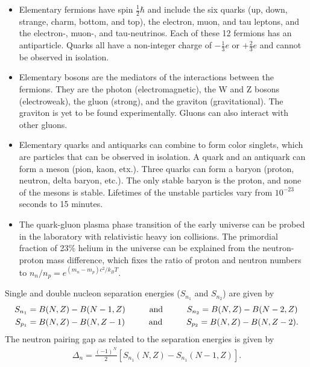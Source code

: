 \begin{itemize}
	\item Elementary fermions have spin $\frac{1}{2}\hbar$ and include the six quarks (up, down, strange, charm, bottom, and top), the electron, muon, and tau leptons, and the electron-, muon-, and tau-neutrinos. Each of these 12 fermions has an antiparticle. Quarks all have a non-integer charge of $-\frac{1}{3}e$ or $+\frac{2}{3}e$ and cannot be observed in isolation.
	\item Elementary bosons are the mediators of the interactions between the fermions. They are the photon (electromagnetic), the W and Z bosons (electroweak), the gluon (strong), and the graviton (gravitational). The graviton is yet to be found experimentally. Gluons can also interact with other gluons. 
	\item Elementary quarks and antiquarks can combine to form color singlets, which are particles that can be observed in isolation. A quark and an antiquark can form a meson (pion, kaon, etx.). Three quarks can form a baryon (proton, neutron, delta baryon, etc.). The only stable baryon is the proton, and none of the mesons is stable. Lifetimes of the unstable particles vary from $10^{-23}$ seconds to 15 minutes.
	\item The quark-gluon plasma phase transition of the early universe can be probed in the laboratory with relativistic heavy ion collisions. The primordial fraction of 23\% helium in the universe can be explained from the neutron-proton mass difference, which fixes the ratio of proton and neutron numbers to $n_n/n_p = e^{(m_n-m_p)c^2/k_BT}$.
\end{itemize}
Single and double nucleon separation energies ($S_{n_1}$ and $S_{n_2}$) are given by
\begin{align}
	S_{n_1} &= B(N,Z)-B(N-1,Z) \andspace{1cm} S_{n_2} = B(N,Z)-B(N-2,Z) \\
	S_{p_1} &= B(N,Z)-B(N,Z-1) \andspace{1cm} S_{p_2} = B(N,Z)-B(N,Z-2).
\end{align}
The neutron pairing gap as related to the separation energies is given by
\begin{align}
\Delta_{n} = \frac{(-1)^N}{2} \left[S_{n_1}(N,Z)-S_{n_1}(N-1,Z)\right].
\end{align}
